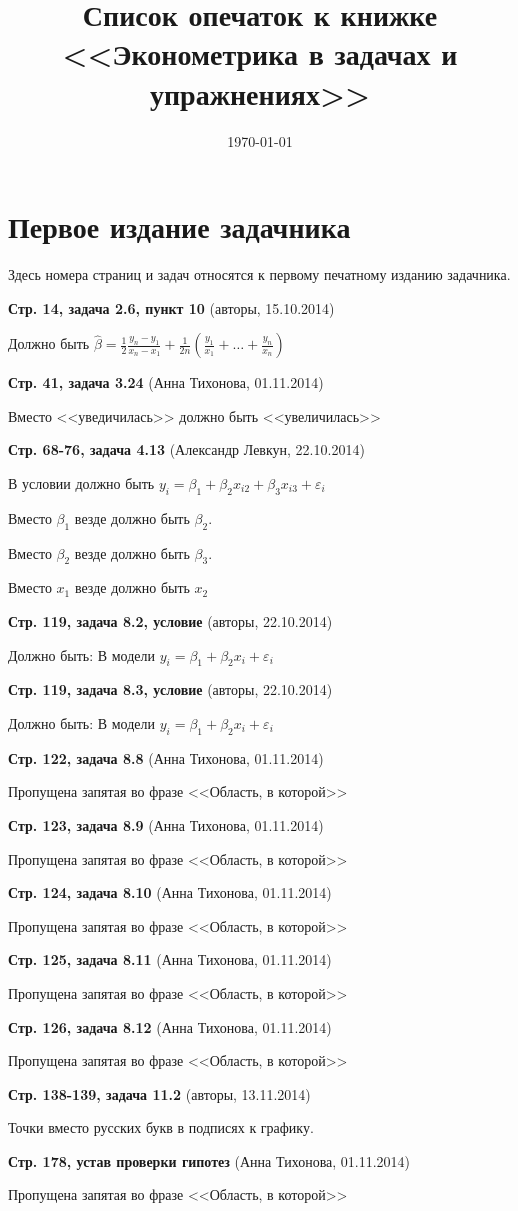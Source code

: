 \documentclass{article}
\date{\today}
\title{Список опечаток к книжке \\
<<Эконометрика в задачах и упражнениях>>}
\newcommand{\erroronpage}[4]{\textbf{Стр. #1, #2} (#3, #4)}
\begin{document}
\maketitle

\section{Первое издание задачника}

Здесь номера страниц и задач относятся к первому печатному изданию задачника.




\erroronpage{14}{задача 2.6, пункт 10}{авторы}{15.10.2014}

Должно быть $\hat{\beta} = \frac{1}{2} \frac{y_n - y_1}{x_n - x_1} + \frac{1}{2n}  \left( \frac{y_1}{x_1} + \ldots + \frac{y_n}{x_n} \right) $

\erroronpage{41}{задача 3.24}{Анна Тихонова}{01.11.2014}

Вместо <<уведичилась>> должно быть <<увеличилась>>

\erroronpage{68-76}{задача 4.13}{Александр Левкун}{22.10.2014}

В условии должно быть $y_i=\beta_1+\beta_2 x_{i2} + \beta_3 x_{i3}+\varepsilon_i$

Вместо $\beta_1$ везде должно быть $\beta_2$.

Вместо $\beta_2$ везде должно быть $\beta_3$.

Вместо $x_1$ везде должно быть $x_2$

\erroronpage{119}{задача 8.2, условие}{авторы}{22.10.2014}

Должно быть: В модели $y_i=\beta_1 + \beta_2 x_i +\varepsilon_i$

\erroronpage{119}{задача 8.3, условие}{авторы}{22.10.2014}

Должно быть: В модели $y_i=\beta_1 + \beta_2 x_i +\varepsilon_i$

\erroronpage{122}{задача 8.8}{Анна Тихонова}{01.11.2014}

Пропущена запятая во фразе <<Область, в которой>>

\erroronpage{123}{задача 8.9}{Анна Тихонова}{01.11.2014}

Пропущена запятая во фразе <<Область, в которой>>

\erroronpage{124}{задача 8.10}{Анна Тихонова}{01.11.2014}

Пропущена запятая во фразе <<Область, в которой>>

\erroronpage{125}{задача 8.11}{Анна Тихонова}{01.11.2014}

Пропущена запятая во фразе <<Область, в которой>>

\erroronpage{126}{задача 8.12}{Анна Тихонова}{01.11.2014}

Пропущена запятая во фразе <<Область, в которой>>

\erroronpage{138-139}{задача 11.2}{авторы}{13.11.2014}

Точки вместо русских букв в подписях к графику. 

\erroronpage{178}{устав проверки гипотез}{Анна Тихонова}{01.11.2014}

Пропущена запятая во фразе <<Область, в которой>>
\end{document}
